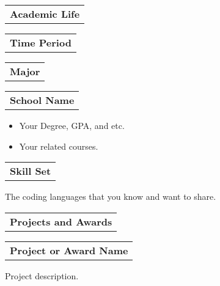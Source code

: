 \documentclass{article}
\begin{document}
    \begin{tabular}[c]{l}
      \textbf{Academic Life} \end{tabular} 
      \hline \hline \vspace{2pt}
      \begin{tabular}[c]{l} \textbf{Time Period} \end{tabular} \hfill
      \begin{tabular}[c]{c} \textbf{Major} \end{tabular} \hfill
      \begin{tabular}[c]{r} \textbf{School Name} 
    \end{tabular}
    
   \begin{description}[style=nextline, listparindent=\parindent, parsep=0pt, \vspace{-1pt}]
    \begin{itemize}[, leftmargin=.01in]
        \item Your Degree, GPA, and etc.
        \item Your related courses.
    \end{itemize}
   \end{description}
   
   \skip

    \begin{tabular}[c]{l}
      \textbf{Skill Set} \end{tabular} 
      \hline \hline \vspace{2pt}
    
   \begin{description}[style=nextline, listparindent=\parindent, parsep=0pt, \vspace{1pt}]
    \begin{itemize}[, leftmargin=.01in]
        The coding languages that you know and want to share.
    \end{itemize}
   \end{description} 
   
   \skip
    \begin{tabular}[c]{l}
      \textbf{Projects and Awards} \end{tabular} 
      \hline \hline \vspace{2pt}
    
   \begin{tabular}[c]{l} \textbf{Project or Award Name} \end{tabular} 
    
   \begin{description}[style=nextline, listparindent=\parindent, parsep=0pt,  \vspace{-1pt}]
    \begin{itemize}[, leftmargin=.01in]
        Project description.
    \end{itemize}
   \end{description} 
   
\end{document}
